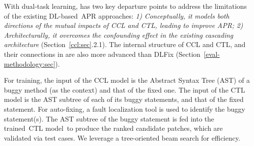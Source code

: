 %
With dual-task learning, {\tool} has two key departure points to
address the limitations of the existing DL-based~APR approaches: {\em
  1) Conceptually, it models both directions of the mutual impacts of
  CCL and CTL, leading to improve APR; 2) Architecturally, it
  overcomes the confounding effect in the existing cascading
  architecture} (Section~\ref{ccl:sec}.2.1). The internal structure of CCL
and CTL, and their connections in {\tool} are also more advanced than
DLFix (Section~\ref{eval-methodology:sec}).

For training, the input of the CCL model is the Abstract Syntax Tree
(AST) of a buggy method (as the context) and that of the fixed one.
The input of the CTL model is the AST subtree of each of its buggy
statements, and that of the fixed statement. For
auto-fixing, a fault localization tool is used to identify the buggy
statement(s). The AST subtree of the buggy statement is fed into the
trained~CTL model~to produce the ranked candidate patches, which are
validated via test cases. We leverage a tree-oriented beam search for
efficiency.


